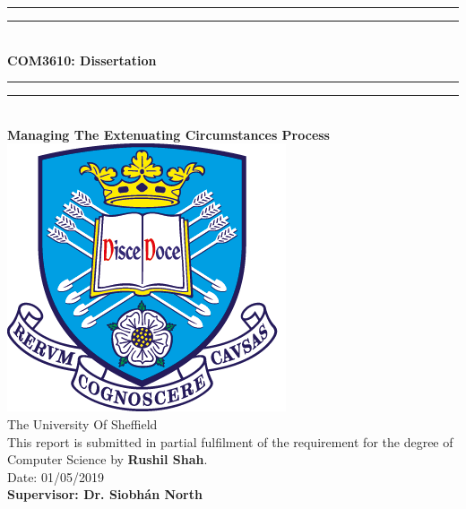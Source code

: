 \documentclass[../main.tex]{subfiles}
\begin{document}
\begin{center}
\rule[0.5ex]{\linewidth}{2pt}\vspace*{-\baselineskip}\vspace*{3.2pt}
\rule[0.5ex]{\linewidth}{1pt}\\[\baselineskip]

\textbf{ {\LARGE COM3610: Dissertation}}\\[2mm]

\rule[0.5ex]{\linewidth}{1pt}\vspace*{-\baselineskip}\vspace{3.2pt}
\rule[0.5ex]{\linewidth}{2pt}\\[4mm]

\textbf{{\large Managing The Extenuating Circumstances Process}}\\[20mm]


\includegraphics[scale=2]{images/TuosLogo.png}\\[12mm]

{\LARGE The University Of Sheffield}\\[2mm]
This report is submitted in partial fulfilment of the requirement for the degree of Computer Science by \textbf{Rushil Shah}.\\[2mm]

Date: 01/05/2019\\[20mm]
{\large \textbf{Supervisor: Dr. Siobhán North}}

\end{center}





%
%
%
\end{document}
